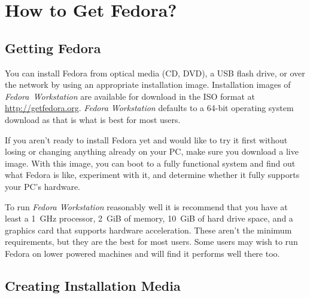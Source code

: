 \section*{How to Get Fedora?}
\subsection*{Getting Fedora}

You can install Fedora from optical media (CD, DVD), a USB flash drive, or over the network by using an appropriate installation image. Installation images of \emph{Fedora~Workstation} are available for download in the ISO format at \url{http://getfedora.org}. \emph{Fedora Workstation} defaults to a 64-bit operating system download as that is what is best for most users.

If you aren't ready to install Fedora yet and would like to try it first without losing or changing anything already on your PC, make sure you download a live image. With this image, you can boot to a fully functional system and find out what Fedora is like, experiment with it, and determine whether it fully supports your PC's hardware.

To run \emph{Fedora Workstation} reasonably well it is recommend that you have at least a 1~GHz processor, 2~GiB of memory, 10~GiB of hard drive space, and a graphics card that supports hardware acceleration. These aren't the minimum requirements, but they are the best for most users. Some users may wish to run Fedora on lower powered machines and will find it performs well there too.

\subsection*{Creating Installation Media}

